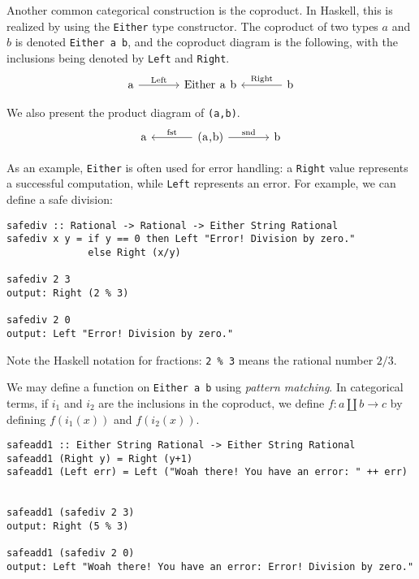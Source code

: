 \documentclass[11pt]{article}
\theoremstyle{nonumberplain}
\newcommand*\lsin{\lstinline}
\newcommand*\lsmath[1]{\text{\lstinline|#1|}}
\begin{document}
Another common categorical construction is the coproduct. In Haskell, this is realized by using the \lsin|Either| type constructor. The coproduct of two types $a$ and $b$ is denoted \lsin|Either a b|, and the coproduct diagram is the following, with the inclusions being denoted by \lsin|Left| and \lsin|Right|.
\begin{equation}
\begin{tikzcd}[column sep = large]
\lsmath{a} \arrow[r, "\lsmath{Left}"] & \lsmath{Either a b} & \lsmath{b} \arrow[l, "\lsmath{Right}"']
\end{tikzcd}
\end{equation}

We also present the product diagram of \lsin|(a,b)|.
\begin{equation}
\begin{tikzcd}[column sep=large]
\lsmath{a} & \lsmath{(a,b)} \arrow[l, "\lsmath{fst}"'] \arrow[r, "\lsmath{snd}"] & \lsmath{b} 
\end{tikzcd}
\end{equation}

As an example, \lsin|Either| is often used for error handling: a \lsin|Right| value represents a successful computation, while \lsin|Left| represents an error. For example, we can define a safe division:
\begin{lstlisting}
safediv :: Rational -> Rational -> Either String Rational
safediv x y = if y == 0 then Left "Error! Division by zero."
              else Right (x/y)
              
safediv 2 3
output: Right (2 % 3)

safediv 2 0
output: Left "Error! Division by zero."
\end{lstlisting}

Note the Haskell notation for fractions: \lsin|2 %

We may define a function on \lsin|Either a b| using \emph{pattern matching}. In categorical terms, if $i_1$ and $i_2$ are the inclusions in the coproduct, we define $f \colon a \amalg b \to c$ by defining $f(i_1(x))$ and $f(i_2(x))$.

\begin{lstlisting}
safeadd1 :: Either String Rational -> Either String Rational
safeadd1 (Right y) = Right (y+1)
safeadd1 (Left err) = Left ("Woah there! You have an error: " ++ err)


safeadd1 (safediv 2 3)
output: Right (5 % 3)

safeadd1 (safediv 2 0)
output: Left "Woah there! You have an error: Error! Division by zero."
\end{lstlisting}
\end{document}

